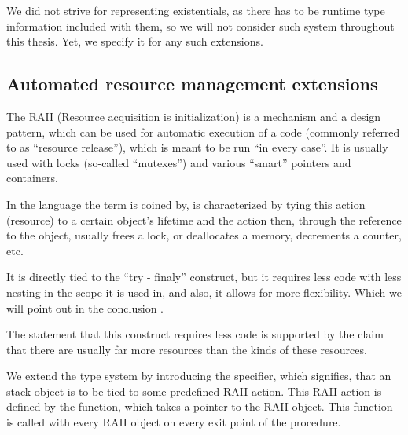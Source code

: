 We did not strive for representing existentials, as there has to be runtime type information included with them, so we will not consider such system throughout this thesis. Yet, we specify it for any such extensions.




\subsection{Automated resource management extensions}
\label{RAII}


The RAII (Resource acquisition is initialization) is a mechanism and a design pattern, which can be used for automatic execution of a code (commonly referred to as ``resource release''), which is meant to be run ``in every case''. It is usually used with locks (so-called ``mutexes'') and various ``smart'' pointers and containers.

In the language the term is coined by, is characterized by tying this action (resource) to a certain object's lifetime and the action then, through the reference to the object, usually frees a lock, or deallocates a memory, decrements a counter, etc.

It is directly tied to the ``try - finaly''  construct, but it requires less code with less nesting in the scope it is used in, and also, it allows for more flexibility. Which we will point out in the conclusion .

The statement that this construct requires less code is supported by the claim that there are usually far more resources than the kinds of these resources.

We extend the type system by introducing the  specifier, which signifies, that an stack object is to be tied to some predefined RAII action. This RAII action is defined by the  function, which takes a pointer to the RAII object. This function is called with every RAII object on every exit point of the procedure.

